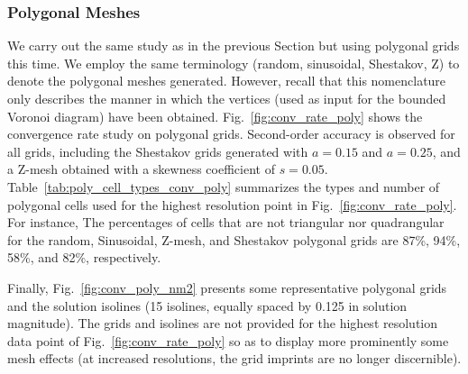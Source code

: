 \documentclass[preprint,10pt]{elsarticle}
\newcommand{\fig}[1]{Fig.~\ref{#1}}                      %
\newcommand{\tbl}[1]{Table~\ref{#1}}                     %
\begin{document}
\pagebreak
\newpage
\pagebreak
\newpage


\subsubsection{Polygonal Meshes} \label{sec:results_conv_poly}

We carry out the same study as in the previous Section but using polygonal grids this time. We employ the same terminology 
(random, sinusoidal, Shestakov, Z) to denote the polygonal meshes generated. However, recall that this nomenclature 
only describes the manner in which the vertices (used as input for the bounded Voronoi diagram) have been obtained.
%
\fig{fig:conv_rate_poly} shows the convergence rate study on polygonal grids. Second-order accuracy is observed for all 
grids, including the Shestakov grids generated with $a=0.15$ and $a=0.25$, and a Z-mesh obtained with a skewness 
coefficient of $s=0.05$.
\tbl{tab:poly_cell_types_conv_poly} summarizes the types and number of polygonal cells used for the highest resolution point in 
\fig{fig:conv_rate_poly}. For instance, The percentages of cells that are not triangular nor quadrangular for the random, Sinusoidal, 
Z-mesh, and Shestakov polygonal grids are 87\%, 94\%, 58\%, and 82\%, respectively.

Finally, \fig{fig:conv_poly_nm2} presents some representative polygonal grids and the solution isolines (15 isolines, equally spaced by 0.125 in solution magnitude). The grids and isolines are not provided for the highest resolution data point of \fig{fig:conv_rate_poly} so as to display more prominently some mesh effects (at increased resolutions, the grid imprints are no longer discernible).
\end{document}
